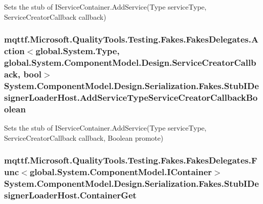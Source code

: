 Sets the stub of I\-Service\-Container.\-Add\-Service(\-Type service\-Type, Service\-Creator\-Callback callback)

\hypertarget{class_system_1_1_component_model_1_1_design_1_1_serialization_1_1_fakes_1_1_stub_i_designer_loader_host_ae5c35ef637e6ae2d1ca64cdf829d96b2}{
\subsubsection[{Add\-Service\-Type\-Service\-Creator\-Callback\-Boolean}]{\setlength{\rightskip}{0pt plus 5cm}mqttf.\-Microsoft.\-Quality\-Tools.\-Testing.\-Fakes.\-Fakes\-Delegates.\-Action$<$global.\-System.\-Type, global.\-System.\-Component\-Model.\-Design.\-Service\-Creator\-Callback, bool$>$ System.\-Component\-Model.\-Design.\-Serialization.\-Fakes.\-Stub\-I\-Designer\-Loader\-Host.\-Add\-Service\-Type\-Service\-Creator\-Callback\-Boolean}}\label{class_system_1_1_component_model_1_1_design_1_1_serialization_1_1_fakes_1_1_stub_i_designer_loader_host_ae5c35ef637e6ae2d1ca64cdf829d96b2}


Sets the stub of I\-Service\-Container.\-Add\-Service(\-Type service\-Type, Service\-Creator\-Callback callback, Boolean promote)

\hypertarget{class_system_1_1_component_model_1_1_design_1_1_serialization_1_1_fakes_1_1_stub_i_designer_loader_host_ab00a013110673c6e7d2a6868121a7f24}{
\subsubsection[{Container\-Get}]{\setlength{\rightskip}{0pt plus 5cm}mqttf.\-Microsoft.\-Quality\-Tools.\-Testing.\-Fakes.\-Fakes\-Delegates.\-Func$<$global.\-System.\-Component\-Model.\-I\-Container$>$ System.\-Component\-Model.\-Design.\-Serialization.\-Fakes.\-Stub\-I\-Designer\-Loader\-Host.\-Container\-Get}}\label{class_system_1_1_component_model_1_1_design_1_1_serialization_1_1_fakes_1_1_stub_i_designer_loader_host_ab00a013110673c6e7d2a6868121a7f24}



